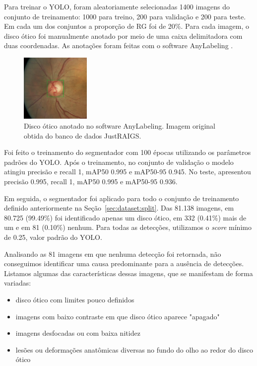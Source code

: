 \documentclass[12pt]{article}
\begin{document}
Para treinar o YOLO, foram aleatoriamente selecionadas 1400 imagens do conjunto de treinamento: 1000 para treino, 200 para validação e 200 para teste. Em cada um dos conjuntos a proporção de RG foi de 20\%. Para cada imagem, o disco ótico foi manualmente anotado por meio de uma caixa delimitadora com duas coordenadas. As anotações foram feitas com o software AnyLabeling \cite{anylabeling}.

\begin{figure}[htb]
 \centering
 \includegraphics[width=0.3\textwidth]{images/disk_labeling.png}
 \caption{Disco ótico anotado no software AnyLabeling. Imagem original obtida do banco de dados JustRAIGS.}
 \label{fig:disk_labeling}
\end{figure}

Foi feito o treinamento do segmentador com 100 épocas utilizando os parâmetros padrões do YOLO. Após o treinamento, no conjunto de validação o modelo atingiu precisão e recall 1, mAP50 0.995 e mAP50-95 0.945. No teste, apresentou precisão 0.995, recall 1, mAP50 0.995 e mAP50-95 0.936.

Em seguida, o segmentador foi aplicado para todo o conjunto de treinamento definido anteriormente na Seção~\ref{sec:dataset:split}. Das 81.138 imagens, em 80.725 (99.49\%) foi identificado apenas um disco ótico, em 332 (0.41\%) mais de um e em 81 (0.10\%) nenhum. Para todas as detecções, utilizamos o \emph{score} mínimo de 0.25, valor padrão do YOLO.

Analisando as 81 imagens em que nenhuma detecção foi retornada, não conseguimos identificar uma causa predominante para a ausência de detecções. Listamos algumas das características dessas imagens, que se manifestam de forma variadas:

\begin{itemize}
    \item disco ótico com limites pouco definidos
    \item imagens com baixo contraste em que disco ótico aparece "apagado"
    \item imagens desfocadas ou com baixa nitidez
    \item lesões ou deformações anatômicas diversas no fundo do olho ao redor do disco ótico
\end{itemize}
\end{document}
